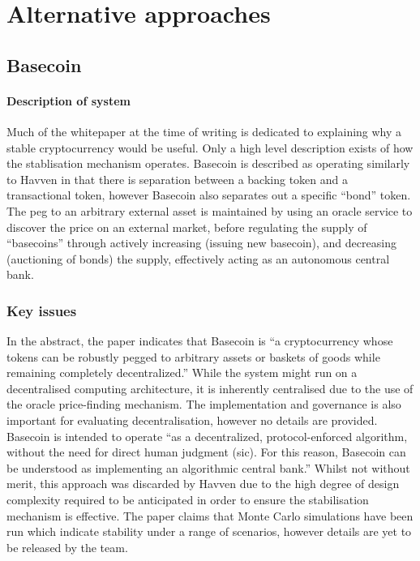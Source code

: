 \section{Alternative approaches}

\subsection{Basecoin}

\paragraph{Description of system}

\noindent Much of the whitepaper at the time of writing is dedicated to explaining why a stable cryptocurrency would be useful. Only a high level description exists of how the stablisation mechanism operates. Basecoin is described as operating similarly to Havven in that there is separation between a backing token and a transactional token, however Basecoin also separates out a specific ``bond'' token. The peg to an arbitrary external asset is maintained by using an oracle service to discover the price on an external market, before regulating the supply of ``basecoins'' through actively increasing (issuing new basecoin), and decreasing (auctioning of bonds) the supply, effectively acting as an autonomous central bank.

\subsubsection{Key issues}

\noindent In the abstract, the paper indicates that Basecoin is ``a cryptocurrency whose tokens can be robustly pegged to arbitrary assets or baskets of goods while remaining completely decentralized.'' While the system might run on a decentralised computing architecture, it is inherently centralised due to the use of the oracle price-finding mechanism. The implementation and governance is also important for evaluating decentralisation, however no details are provided. \\

\noindent Basecoin is intended to operate ``as a decentralized, protocol-enforced algorithm, without the need for direct human judgment (sic). For this reason, Basecoin can be understood as implementing an algorithmic central bank.'' Whilst not without merit, this approach was discarded by Havven due to the high degree of design complexity required to be anticipated in order to ensure the stabilisation mechanism is effective. The paper claims that Monte Carlo simulations have been run which indicate stability under a range of scenarios, however details are yet to be released by the team. \\

